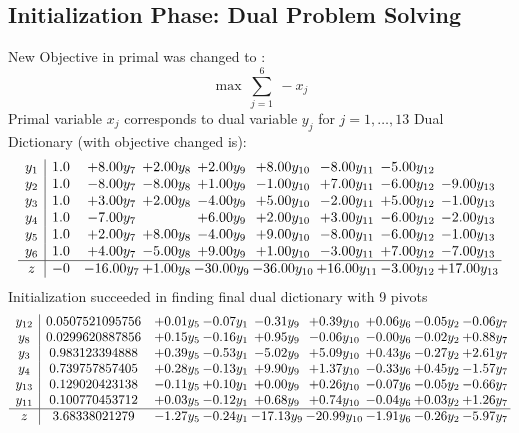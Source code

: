 \documentclass[9pt]{article}
\begin{document}
\subsection{Initialization Phase: Dual Problem Solving}
New Objective in primal was changed to : \[ \max\ \sum_{j=1}^{6}\ - x_j \] 
Primal variable $x_j$ corresponds to dual variable $y_j$ for $j = 1,\ldots,13$
Dual Dictionary (with objective changed is): 
\[\begin{array}{c| c c@{\hskip 2pt} c@{\hskip 2pt} c@{\hskip 2pt} c@{\hskip 2pt} c@{\hskip 2pt} c@{\hskip 2pt} c@{\hskip 2pt} }
 y_{1}   &  1.0 & +  8.00 y_{7} & +  2.00 y_{8} & +  2.00 y_{9} & +  8.00 y_{10} & -8.00 y_{11} & -5.00 y_{12} &   \\
 y_{2}   &  1.0 & -8.00 y_{7} & -8.00 y_{8} & +  1.00 y_{9} & -1.00 y_{10} & +  7.00 y_{11} & -6.00 y_{12} & -9.00 y_{13}\\
 y_{3}   &  1.0 & +  3.00 y_{7} & +  2.00 y_{8} & -4.00 y_{9} & +  5.00 y_{10} & -2.00 y_{11} & +  5.00 y_{12} & -1.00 y_{13}\\
 y_{4}   &  1.0 & -7.00 y_{7} &   & +  6.00 y_{9} & +  2.00 y_{10} & +  3.00 y_{11} & -6.00 y_{12} & -2.00 y_{13}\\
 y_{5}   &  1.0 & +  2.00 y_{7} & +  8.00 y_{8} & -4.00 y_{9} & +  9.00 y_{10} & -8.00 y_{11} & -6.00 y_{12} & -1.00 y_{13}\\
 y_{6}   &  1.0 & +  4.00 y_{7} & -5.00 y_{8} & +  9.00 y_{9} & +  1.00 y_{10} & -3.00 y_{11} & +  7.00 y_{12} & -7.00 y_{13}\\
\hline
z    &  -0 & -16.00 y_{7} & +  1.00 y_{8} & -30.00 y_{9} & -36.00 y_{10} & + 16.00 y_{11} & -3.00 y_{12} & + 17.00 y_{13}\\
\end{array}\]
Initialization succeeded in finding final dual dictionary with 9 pivots
\[\begin{array}{c| c c@{\hskip 2pt} c@{\hskip 2pt} c@{\hskip 2pt} c@{\hskip 2pt} c@{\hskip 2pt} c@{\hskip 2pt} c@{\hskip 2pt} }
 y_{12}   &  0.0507521095756 & +  0.01 y_{5} & -0.07 y_{1} & -0.31 y_{9} & +  0.39 y_{10} & +  0.06 y_{6} & -0.05 y_{2} & -0.06 y_{7}\\
 y_{8}   &  0.0299620887856 & +  0.15 y_{5} & -0.16 y_{1} & +  0.95 y_{9} & -0.06 y_{10} & -0.00 y_{6} & -0.02 y_{2} & +  0.88 y_{7}\\
 y_{3}   &  0.983123394888 & +  0.39 y_{5} & -0.53 y_{1} & -5.02 y_{9} & +  5.09 y_{10} & +  0.43 y_{6} & -0.27 y_{2} & +  2.61 y_{7}\\
 y_{4}   &  0.739757857405 & +  0.28 y_{5} & -0.13 y_{1} & +  9.90 y_{9} & +  1.37 y_{10} & -0.33 y_{6} & +  0.45 y_{2} & -1.57 y_{7}\\
 y_{13}   &  0.129020423138 & -0.11 y_{5} & +  0.10 y_{1} & +  0.00 y_{9} & +  0.26 y_{10} & -0.07 y_{6} & -0.05 y_{2} & -0.66 y_{7}\\
 y_{11}   &  0.100770453712 & +  0.03 y_{5} & -0.12 y_{1} & +  0.68 y_{9} & +  0.74 y_{10} & -0.04 y_{6} & +  0.03 y_{2} & +  1.26 y_{7}\\
\hline
z    &  3.68338021279 & -1.27 y_{5} & -0.24 y_{1} & -17.13 y_{9} & -20.99 y_{10} & -1.91 y_{6} & -0.26 y_{2} & -5.97 y_{7}\\
\end{array}\]
\end{document}
